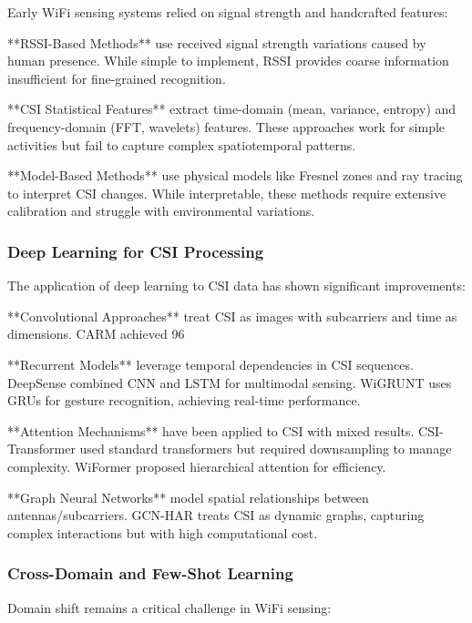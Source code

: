 \documentclass[10pt,journal,compsoc]{IEEEtran}
\begin{document}
Early WiFi sensing systems relied on signal strength and handcrafted features:

**RSSI-Based Methods** use received signal strength variations caused by human presence. While simple to implement, RSSI provides coarse information insufficient for fine-grained recognition.

**CSI Statistical Features** extract time-domain (mean, variance, entropy) and frequency-domain (FFT, wavelets) features. These approaches work for simple activities but fail to capture complex spatiotemporal patterns.

**Model-Based Methods** use physical models like Fresnel zones and ray tracing to interpret CSI changes. While interpretable, these methods require extensive calibration and struggle with environmental variations.

\subsubsection{Deep Learning for CSI Processing}

The application of deep learning to CSI data has shown significant improvements:

**Convolutional Approaches** treat CSI as images with subcarriers and time as dimensions. CARM \cite{carm2017} achieved 96%

**Recurrent Models** leverage temporal dependencies in CSI sequences. DeepSense \cite{deepsense2017} combined CNN and LSTM for multimodal sensing. WiGRUNT uses GRUs for gesture recognition, achieving real-time performance.

**Attention Mechanisms** have been applied to CSI with mixed results. CSI-Transformer \cite{csitransformer2022} used standard transformers but required downsampling to manage complexity. WiFormer \cite{wiformer2023} proposed hierarchical attention for efficiency.

**Graph Neural Networks** model spatial relationships between antennas/subcarriers. GCN-HAR treats CSI as dynamic graphs, capturing complex interactions but with high computational cost.

\subsubsection{Cross-Domain and Few-Shot Learning}

Domain shift remains a critical challenge in WiFi sensing:
\end{document}
